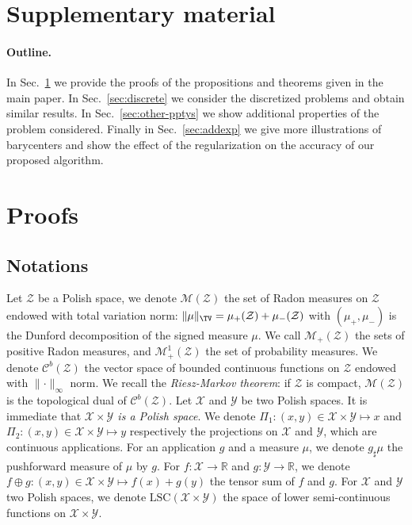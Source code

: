 \section*{Supplementary material}
\paragraph{Outline.} In Sec.~\ref{sec:proofs} we provide the proofs of the propositions and theorems given in the main paper. In Sec.~\ref{sec:discrete} we consider the discretized problems and obtain similar results. In Sec.~\ref{sec:other-pptys} we show additional properties of the problem considered. Finally in Sec.~\ref{sec:addexp} we give more illustrations of barycenters and show the effect of the regularization on the accuracy of our proposed algorithm. 


\section{Proofs}
\label{sec:proofs}
\subsection{Notations}


Let $\mathcal{Z}$ be a Polish space, we denote $\mathcal{M}(\mathcal{Z})$ the set of Radon measures on $\mathcal{Z}$ endowed with total variation norm: $\lVert\mu\rVert_{\TV}=\mu_+(\mathcal{Z})+\mu_-(\mathcal{Z})$ with $(\mu_+,\mu_-)$ is the Dunford decomposition of the signed measure $\mu$. We call $\mathcal{M}_+(\mathcal{Z})$ the sets of positive Radon measures, and  $\mathcal{M}^1_+(\mathcal{Z})$ the set of probability measures. We denote $\mathcal{C}^b(\mathcal{Z})$ the vector space of bounded continuous functions on $\mathcal{Z}$ endowed with $\lVert\cdot \rVert_\infty$ norm. We recall the \textit{Riesz-Markov theorem}: if $\mathcal{Z}$ is compact, $\mathcal{M}(\mathcal{Z})$ is the topological dual of $\mathcal{C}^b(\mathcal{Z})$. Let $\mathcal{X}$ and $\mathcal{Y}$ be two Polish spaces. It is immediate  that \textit{$\mathcal{X}\times\mathcal{Y}$ is a Polish space}.  We denote $\Pi_1:(x,y)\in\mathcal{X}\times\mathcal{Y}\mapsto x$ and $\Pi_2:(x,y)\in\mathcal{X}\times\mathcal{Y}\mapsto y$ respectively the projections on $\mathcal{X}$ and  $\mathcal{Y}$, which are continuous applications. For an application $g$ and a measure $\mu$, we denote $g_\sharp\mu$ the pushforward measure of $\mu$ by $g$. For $f:\mathcal{X}\rightarrow\mathbb{R}$ and $g:\mathcal{Y}\rightarrow\mathbb{R}$, we denote $f\oplus g:(x,y)\in\mathcal{X}\times\mathcal{Y}\mapsto f(x)+g(y)$ the tensor sum of $f$ and $g$. For  $\mathcal{X}$ and $\mathcal{Y}$ two Polish spaces, we denote $\text{LSC}(\mathcal{X}\times\mathcal{Y})$ the space of lower semi-continuous functions on $\mathcal{X}\times\mathcal{Y}$.


